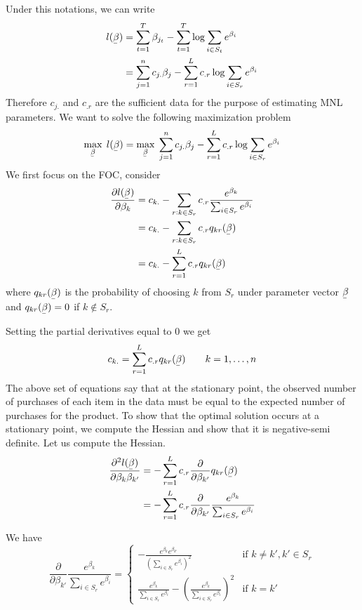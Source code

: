 \documentclass[11pt]{article}
\newcommand{\ubar}[1]{\underaccent{\bar}{#1}}
\begin{document}
Under this notations, we can write 
\begin{align*}
l ( \ubar \beta )  &= \sum_{t=1}^T  \beta_{j_t} - \sum_{t=1}^T\log \sum_{i \in S_t} e^{\beta_i} \\
&= \sum_{j=1}^n   c_{j.} \beta_{j} - \sum_{r=1}^L  c_{.r}  \log \sum_{i \in S_r} e^{\beta_i} \\
\end{align*}
Therefore $c_{j.} $ and $c_{.r}$ are the sufficient data for the purpose of estimating MNL parameters. We want to solve the following maximization problem
$$ \max_{\ubar \beta} \;  l ( \ubar \beta )  =  \max_{\ubar \beta}  \; \sum_{j=1}^n   c_{j.} \beta_{j} - \sum_{r=1}^L  c_{.r}  \log \sum_{i \in S_r} e^{\beta_i}$$
We first focus on the FOC, consider
\begin{align*}
\frac{\partial l(\ubar \beta)}{\partial \beta_k} &= c_{k.} - \sum_{r: k \in S_r} c_{.r} \frac{e^{\beta_k}}{\sum_{i \in S_r} e^{\beta_i}} \\
&= c_{k.} - \sum_{r: k \in S_r} c_{.r} q_{kr} ( \ubar \beta) \\
&= c_{k.} - \sum_{r=1}^L c_{.r} q_{kr} ( \ubar \beta) \\
\end{align*}
where $q_{kr} ( \ubar \beta)$ is the probability of choosing $k$ from $S_r$ under parameter vector $ \ubar \beta$ and $q_{kr} ( \ubar \beta)=0$ if $ k \notin S_r$. 

Setting the partial derivatives equal to $0$ we get
$$c_{k.} = \sum_{r=1}^L c_{.r} q_{kr} ( \ubar \beta)  \qquad k=1,\ldots,n $$
The above set of equations say that at the stationary point, the observed number of purchases of each item in the data must be equal to the expected number of purchases for the product. To show that the optimal solution occurs at a stationary point, we compute the Hessian and show that it is negative-semi definite. Let us compute the Hessian.
\begin{align*}
\frac{\partial^2 l(\ubar \beta)}{\partial \beta_k \beta_{k'}} &= - \sum_{r=1}^L c_{.r} \frac{\partial }{\partial \beta_{k'}}     q_{kr} ( \ubar \beta) \\
&= - \sum_{r=1}^L c_{.r} \frac{\partial }{\partial \beta_{k'}}   \frac{e^{\beta_k}}{\sum_{i \in S_r} e^{\beta_i}}  \\
\end{align*}

We have 
$$ \frac{\partial }{\partial \beta_{k'}}   \frac{e^{\beta_k}}{\sum_{i \in S_r} e^{\beta_i}}
= \left\{
    \begin{array}{ll}
       - \frac{e^{\beta_k}e^{\beta_{k'}}}{\left( \sum_{i \in S_r} e^{\beta_i} \right)^2 }                                & \mbox{if } k \neq k' , k' \in S_r \\
        \frac{e^{\beta_k}}{\sum_{i \in S_r} e^{\beta_i}} -       \left( \frac{e^{\beta_k}}{\sum_{i \in S_r} e^{\beta_i}}\right)^2                          & \mbox{if } k=k'
    \end{array}
\right.
$$
\end{document}
